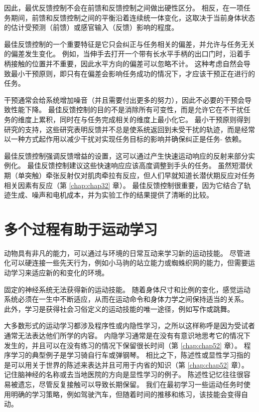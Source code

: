 因此，最优反馈控制不会在前馈和反馈控制之间做出硬性区分。
相反，在一项任务期间，前馈和反馈控制之间的平衡沿着连续统一体变化，这取决于当前身体状态的估计受预测（前馈）或感官输入（反馈）影响的程度。


最佳反馈控制的一个重要特征是它只会纠正与任务相关的偏差，并允许与任务无关的偏差发生变化。
例如，当伸手去打开一个带有长水平手柄的出口门时，沿着手柄接触的位置并不重要，因此水平方向的偏差可以忽略不计。
这种考虑自然会导致最小干预原则，即只有在偏差会影响任务成功的情况下，才应该干预正在进行的任务。


干预通常会给系统增加噪音（并且需要付出更多的努力），因此不必要的干预会导致性能下降。
最佳反馈控制的目的不是消除所有可变性，而是允许它在不干扰任务的维度上累积，同时在与任务完成相关的维度上最小化它。
最小干预原则得到研究的支持，这些研究表明反馈并不总是使系统返回到未受干扰的轨迹，而是经常以一种方式起作用以减少干扰对实现任务目标的影响并确保纠正是任务- 依赖。


最佳反馈控制强调反馈增益的设置，这可以通过产生快速运动响应的反射来部分实例化。
最佳反馈控制建议这些快速响应应该高度调整到手头的任务。
虽然短潜伏期（单突触）牵张反射仅对肌肉牵拉有反应，但人们早就知道长潜伏期反应对任务相关因素有反应（第 \ref{chap:chap32} 章）。
最佳反馈控制很重要，因为它结合了轨迹生成、噪声和电机成本，并为实验工作的结果提供了清晰的比较。



\section{多个过程有助于运动学习}

动物具有非凡的能力，可以通过与环境的日常互动来学习新的运动技能。
尽管进化可以硬连接一些先天行为，例如小马驹的站立能力或蜘蛛织网的能力，但需要运动学习来适应新的和变化的环境。


固定的神经系统无法获得新的运动技能。
随着身体尺寸和比例的变化，感觉运动系统必须在一生中不断适应，从而在运动命令和身体力学之间保持适当的关系。
此外，学习是获得社会习俗定义的运动技能的唯一途径，例如写作或跳舞。


大多数形式的运动学习都涉及程序性或内隐性学习，之所以这样称呼是因为受试者通常无法表达他们所学的内容。 内隐学习通常是在没有有意识地思考它的情况下发生的，并且可以在没有练习的情况下保留很长时间（第 \ref{chap:chap52} 章）。
程序学习的典型例子是学习骑自行车或弹钢琴。 相比之下，陈述性或显性学习指的是可以用关于世界的陈述来表达并且可用于内省的知识（第 \ref{chap:chap52} 章）。
记住脑神经的名称或去当地医院的方向是显性学习的例子。
陈述性记忆往往很容易被遗忘，尽管反复接触可以导致长期保留。
我们在最初学习一些运动任务时使用明确的学习策略，例如驾驶汽车，但随着时间的推移和练习，该技能会变得自动。


